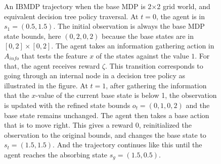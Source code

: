 \begin{figure}[h]
\caption{An IBMDP trajectory when the base MDP is 2$\times$2 grid world, and equivalent decision tree policy traversal. At $t=0$, the agent is in $s_1 = (0.5, 1.5)$. The initial observation is always the base MDP state bounds, here $(0, 2, 0, 2)$ because the base states are in $[0, 2] \times [0, 2]$. The agent takes an information gathering action in $A_{info}$ that tests the feature $x$ of the states against the value $1$. For that, the agent receives reward $\zeta$. This transition corresponds to going through an internal node in a decision tree policy as illustrated in the figure. At $t=1$, after gathering the information that the $x$-value of the current base state is below 1, the observation is updated with the refined state bounds $o_t=(0, 1, 0, 2)$ and the base state remains unchanged. The agent then takes a base action that is to move right. This gives a reward 0, reinitialized the observation to the original bounds, and changes the base state to $s_t=(1.5, 1.5)$. And the trajectory continues like this until the agent reaches the absorbing state $s_g=(1.5, 0.5)$.}
\label{fig:poibmdp_trajectory}
\end{figure}

